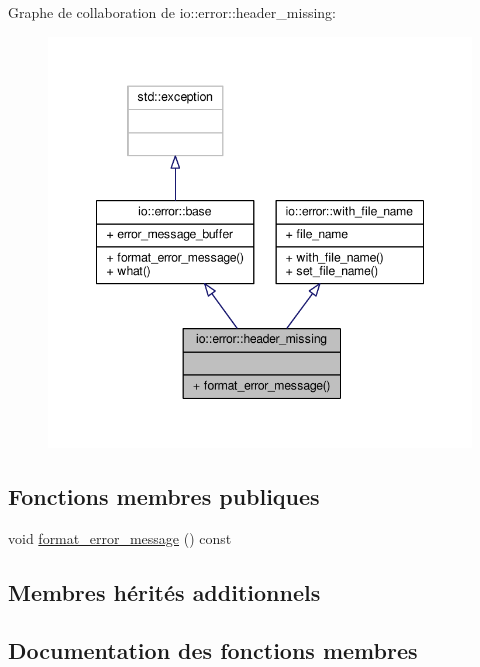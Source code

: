 Graphe de collaboration de io\+:\+:error\+:\+:header\+\_\+missing\+:
\nopagebreak
\begin{figure}[H]
\begin{center}
\leavevmode
\includegraphics[width=348pt]{structio_1_1error_1_1header__missing__coll__graph}
\end{center}
\end{figure}
\subsection*{Fonctions membres publiques}
\begin{DoxyCompactItemize}
\item 
void \hyperlink{structio_1_1error_1_1header__missing_ae130d632556617cf136cc4392b517b30}{format\+\_\+error\+\_\+message} () const
\end{DoxyCompactItemize}
\subsection*{Membres hérités additionnels}


\subsection{Documentation des fonctions membres}
\mbox{\label{structio_1_1error_1_1header__missing_ae130d632556617cf136cc4392b517b30}} 

